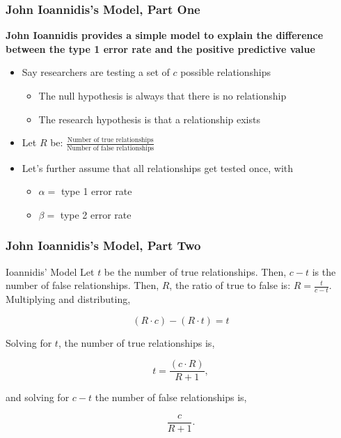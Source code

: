\documentclass[10pt, block=fill]{beamer}
\begin{document}
\begin{frame}
    \frametitle{John Ioannidis's Model, Part One}
    
    \textbf{John Ioannidis provides a simple model to explain the difference between the type 1 error rate and the positive predictive value}
    \begin{itemize}
        \item Say researchers are testing a set of $c$ possible relationships
        \begin{itemize}
            \item The null hypothesis is always that there is no relationship
            \item The research hypothesis is that a relationship exists
        \end{itemize}
        \vspace{0.25in}
        \item Let $R$ be: $\frac{ \text{Number of true relationships} }{ \text{Number of false relationships} }$
        \vspace{0.25in}
        \item Let's further assume that all relationships get tested once, with
        \begin{itemize}
            \item $\alpha=$ type 1 error rate 
            \item $\beta=$ type 2 error rate 
        \end{itemize} 
    \end{itemize}
\end{frame}


\begin{frame}
    \frametitle{John Ioannidis's Model, Part Two}
    
    \begin{block}{Ioannidis' Model} 
    Let $t$ be the number of true relationships. Then, $c-t$ is the number of false relationships. Then, $R$, the ratio of true to false is: $R=\frac{t}{c-t}$. Multiplying and distributing,
    
    $$ 
        (R\cdot c) - (R\cdot t) = t
    $$ 
    
    Solving for $t$, the number of true relationships is, 
    
    $$
        t = \frac{(c\cdot R)}{R+1}, 
    $$
    
    and solving for $c-t$ the number of false relationships is, 
    
    $$
        \frac{c}{R+1}.
    $$
    \end{block}

\end{frame} 
\end{document}
